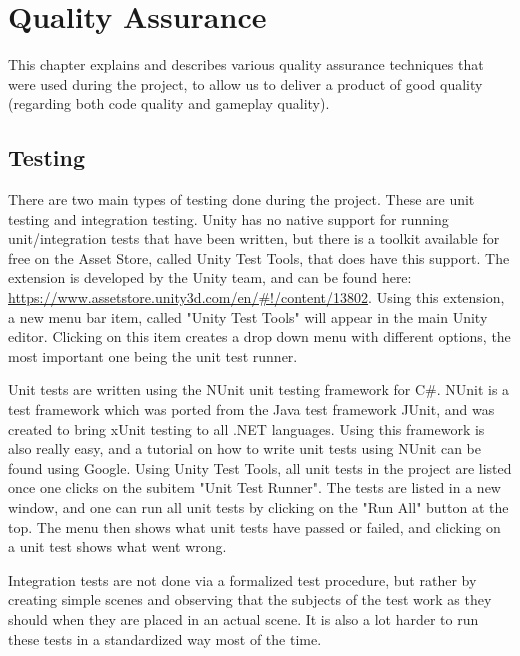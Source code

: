\chapter{Quality Assurance} \label{cha:qa}
	This chapter explains and describes various quality assurance techniques 
	that were used during the project, to allow us to deliver a product of 
	good quality (regarding both code quality and gameplay quality).

	\section{Testing} \label{sec:testing}
	There are two main types of testing done during the project. These are
	unit testing and integration testing. Unity has no native support for
	running unit/integration tests that have been written, but there is a toolkit
	available for free on the Asset Store, called Unity Test Tools, that does
	have this support. The extension is developed by the Unity team, and can be 
	found here: \url{https://www.assetstore.unity3d.com/en/#!/content/13802}.
	Using this extension, a new menu bar item, called "Unity Test Tools"
	will appear in the main Unity editor. Clicking on this item creates a drop
	down menu with different options, the most important one being the unit test
	runner.
	
	Unit tests are written using the NUnit unit testing framework for C\#. NUnit
	is a test framework which was ported from the Java test framework JUnit, and
	was created to bring xUnit testing to all .NET languages. Using this framework
	is also really easy, and a tutorial on how to write unit tests using NUnit
	can be found using Google. Using Unity Test Tools, all unit tests in the
	project are listed once one clicks on the subitem "Unit Test Runner".
	The tests are listed in a new window, and one can run all unit tests by
	clicking on the "Run All" button at the top. The menu then shows what unit tests
	have passed or failed, and clicking on a unit test shows what went wrong.
	
	Integration tests are not done via a formalized test procedure, but rather by
	creating simple scenes and observing that the subjects of the test work
	as they should when they are placed in an actual scene. It is also a lot
	harder to run these tests in a standardized way most of the time. 
		
